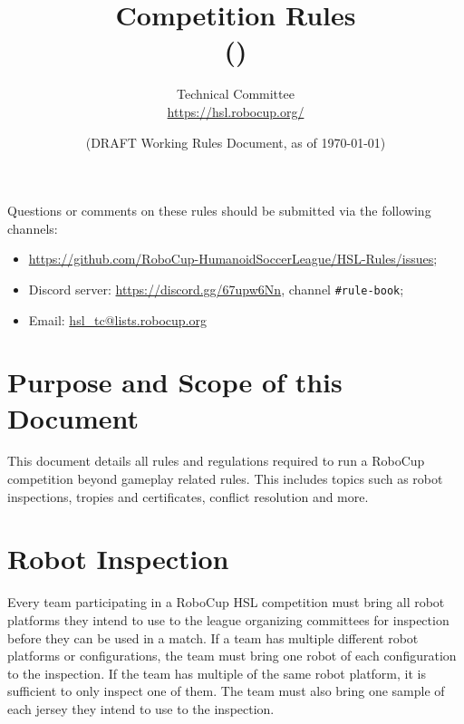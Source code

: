 \documentclass[12pt]{article}
\title{Competition Rules\\\leaguename (\leaguenameabbr)}
\author{\leaguename Technical Committee\\\url{https://hsl.robocup.org/}}
\date{(DRAFT \RCYear Working Rules Document, as of \today)}
\begin{document}
	
	
	\maketitle
	\thispagestyle{empty}
	
	\begin{center}
		Questions or comments on these rules should be submitted via the following channels:
		\begin{itemize}
			\item \url{https://github.com/RoboCup-HumanoidSoccerLeague/HSL-Rules/issues};
			\item Discord server: \url{https://discord.gg/67upw6Nn}, channel \texttt{\#rule-book};
			\item Email: \url{hsl_tc@lists.robocup.org}
		\end{itemize}
	\end{center}
	
	\newpage
	\setcounter{tocdepth}{2}
	\tableofcontents
	
	\thispagestyle{fancy}
	
	\clearpage
	\setcounter{page}{1}
	
	\newpage
	
	\section{Purpose and Scope of this Document}

	This document details all rules and regulations required to run a RoboCup competition beyond gameplay related rules. This includes topics such as robot inspections, tropies and certificates, conflict resolution and more.
	
	\section{Robot Inspection}
	
	Every team participating in a RoboCup HSL competition must bring all robot platforms they intend to use to the league organizing committees for inspection before they can be used in a match. If a team has multiple different robot platforms or configurations, the team must bring one robot of each configuration to the inspection. If the team has multiple of the same robot platform, it is sufficient to only inspect one of them. The team must also bring one sample of each jersey they intend to use to the inspection.
	
\end{document}
